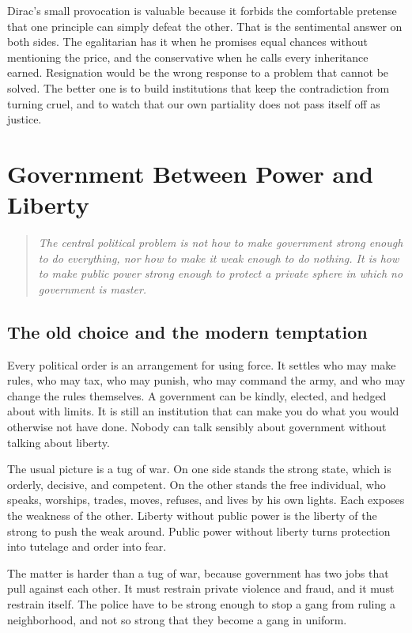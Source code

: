 \documentclass[12pt,a4paper]{book}
\begin{document}
Dirac's small provocation is valuable because it forbids the comfortable pretense that one principle can simply defeat the other. That is the sentimental answer on both sides. The egalitarian has it when he promises equal chances without mentioning the price, and the conservative when he calls every inheritance earned. Resignation would be the wrong response to a problem that cannot be solved. The better one is to build institutions that keep the contradiction from turning cruel, and to watch that our own partiality does not pass itself off as justice.


\chapter{Government Between Power and Liberty}
\label{chap:government-and-liberty}

\begin{quote}
\itshape
The central political problem is not how to make government strong enough to
do everything, nor how to make it weak enough to do nothing.  It is how to
make public power strong enough to protect a private sphere in which no
government is master.
\end{quote}

\section{The old choice and the modern temptation}

Every political order is an arrangement for using force. It settles who may make rules, who may tax, who may punish, who may command the army, and who may change the rules themselves. A government can be kindly, elected, and hedged about with limits. It is still an institution that can make you do what you would otherwise not have done. Nobody can talk sensibly about government without talking about liberty.

The usual picture is a tug of war. On one side stands the strong state, which is orderly, decisive, and competent. On the other stands the free individual, who speaks, worships, trades, moves, refuses, and lives by his own lights. Each exposes the weakness of the other. Liberty without public power is the liberty of the strong to push the weak around. Public power without liberty turns protection into tutelage and order into fear.

The matter is harder than a tug of war, because government has two jobs that pull against each other. It must restrain private violence and fraud, and it must restrain itself. The police have to be strong enough to stop a gang from ruling a neighborhood, and not so strong that they become a gang in uniform.
\end{document}

